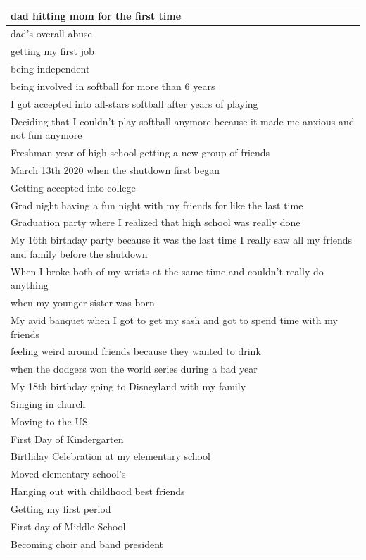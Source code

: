 \documentclass[
  .7em,
  letterpaper,
  DIV=11,
  numbers=noendperiod]{scrartcl}
\begin{document}
\begin{table}
\begin{tabular}{l}
\hline
dad hitting mom for the first time\\
\hline
dad's overall abuse\\
\hline
getting my first job\\
\hline
being independent\\
\hline
being involved in softball for more than 6 years\\
\hline
I got accepted into all-stars softball after years of playing\\
\hline
Deciding that I couldn't play softball anymore because it made me anxious and not fun anymore\\
\hline
Freshman year of high school getting a new group of friends\\
\hline
March 13th 2020 when the shutdown first began\\
\hline
Getting accepted into college\\
\hline
Grad night having a fun night with my friends for like the last time\\
\hline
Graduation party where I realized that high school was really done\\
\hline
My 16th birthday party because it was the last time I really saw all my friends and family before the shutdown\\
\hline
When I broke both of my wrists at the same time and couldn't really do anything\\
\hline
when my younger sister was born\\
\hline
My avid banquet when I got to get my sash and got to spend time with my friends\\
\hline
feeling weird around friends because they wanted to drink\\
\hline
when the dodgers won the world series during a bad year\\
\hline
My 18th birthday going to Disneyland with my family\\
\hline
Singing in church\\
\hline
Moving to the US\\
\hline
First Day of Kindergarten\\
\hline
Birthday Celebration at my elementary school\\
\hline
Moved elementary school's\\
\hline
Hanging out with childhood best friends\\
\hline
Getting my first period\\
\hline
First day of Middle School\\
\hline
Becoming choir and band president\\

\end{tabular}
\end{table}
\end{document}
